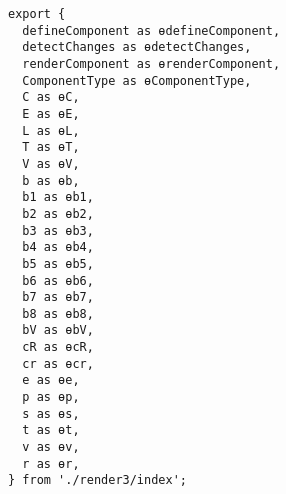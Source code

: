 \begin{verbatim}
export {
  defineComponent as ɵdefineComponent,
  detectChanges as ɵdetectChanges,
  renderComponent as ɵrenderComponent,
  ComponentType as ɵComponentType,
  C as ɵC,
  E as ɵE,
  L as ɵL,
  T as ɵT,
  V as ɵV,
  b as ɵb,
  b1 as ɵb1,
  b2 as ɵb2,
  b3 as ɵb3,
  b4 as ɵb4,
  b5 as ɵb5,
  b6 as ɵb6,
  b7 as ɵb7,
  b8 as ɵb8,
  bV as ɵbV,
  cR as ɵcR,
  cr as ɵcr,
  e as ɵe,
  p as ɵp,
  s as ɵs,
  t as ɵt,
  v as ɵv,
  r as ɵr,
} from './render3/index';
\end{verbatim}
